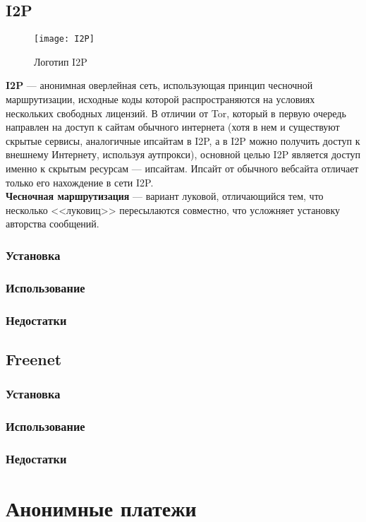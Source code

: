 \subsection{I2P}
\begin{wrapfigure}[6]{r}{0.25\linewidth}
\texttt{[image: I2P]}
\caption{Логотип I2P}
\end{wrapfigure}
\textbf{I2P} --- анонимная оверлейная сеть, использующая принцип чесночной маршрутизации, исходные коды которой распространяются на условиях нескольких свободных лицензий\cite{i2p_license}. В отличии от Tor, который в первую очередь направлен на доступ к сайтам обычного интернета (хотя в нем и существуют скрытые сервисы, аналогичные ипсайтам в I2P, а в I2P можно получить доступ к внешнему Интернету, используя аутпрокси), основной целью I2P является доступ именно к скрытым ресурсам --- ипсайтам. Ипсайт от обычного вебсайта отличает только его нахождение в сети I2P.\\
\textbf{Чесночная маршрутизация} --- вариант луковой, отличающийся тем, что несколько <<луковиц>> пересылаются совместно, что усложняет установку авторства сообщений.
\subsubsection{Установка}
\subsubsection{Использование}
\subsubsection{Недостатки}
\subsection{Freenet}
\subsubsection{Установка}
\subsubsection{Использование}
\subsubsection{Недостатки}

\section{Анонимные платежи}
